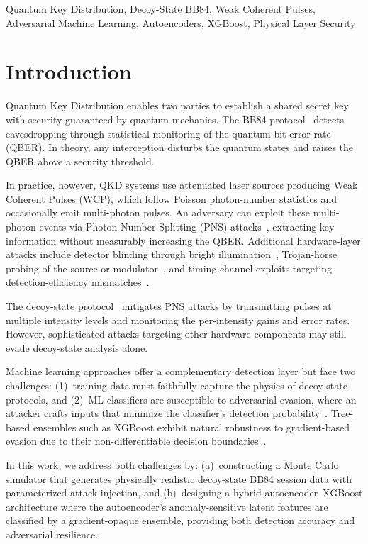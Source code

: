 \documentclass[conference]{IEEEtran}
\begin{document}
\begin{IEEEkeywords}
Quantum Key Distribution, Decoy-State BB84, Weak Coherent Pulses, Adversarial Machine Learning, Autoencoders, XGBoost, Physical Layer Security
\end{IEEEkeywords}

\section{Introduction}

Quantum Key Distribution enables two parties to establish a shared secret key with security guaranteed by quantum mechanics. The BB84 protocol~\cite{bennett1984quantum} detects eavesdropping through statistical monitoring of the quantum bit error rate (QBER). In theory, any interception disturbs the quantum states and raises the QBER above a security threshold.

In practice, however, QKD systems use attenuated laser sources producing Weak Coherent Pulses (WCP), which follow Poisson photon-number statistics and occasionally emit multi-photon pulses. An adversary can exploit these multi-photon events via Photon-Number Splitting (PNS) attacks~\cite{brassard2000limitations}, extracting key information without measurably increasing the QBER. Additional hardware-layer attacks include detector blinding through bright illumination~\cite{lydersen2010hacking}, Trojan-horse probing of the source or modulator~\cite{jain2014trojan, gisin2002quantum}, and timing-channel exploits targeting detection-efficiency mismatches~\cite{qi2007time}.

The decoy-state protocol~\cite{lo2005decoy, ma2005practical} mitigates PNS attacks by transmitting pulses at multiple intensity levels and monitoring the per-intensity gains and error rates. However, sophisticated attacks targeting other hardware components may still evade decoy-state analysis alone.

Machine learning approaches offer a complementary detection layer but face two challenges: (1)~training data must faithfully capture the physics of decoy-state protocols, and (2)~ML classifiers are susceptible to adversarial evasion, where an attacker crafts inputs that minimize the classifier's detection probability~\cite{goodfellow2014explaining}. Tree-based ensembles such as XGBoost exhibit natural robustness to gradient-based evasion due to their non-differentiable decision boundaries~\cite{chen2019robust}.

In this work, we address both challenges by: (a)~constructing a Monte Carlo simulator that generates physically realistic decoy-state BB84 session data with parameterized attack injection, and (b)~designing a hybrid autoencoder--XGBoost architecture where the autoencoder's anomaly-sensitive latent features are classified by a gradient-opaque ensemble, providing both detection accuracy and adversarial resilience.
\end{document}
